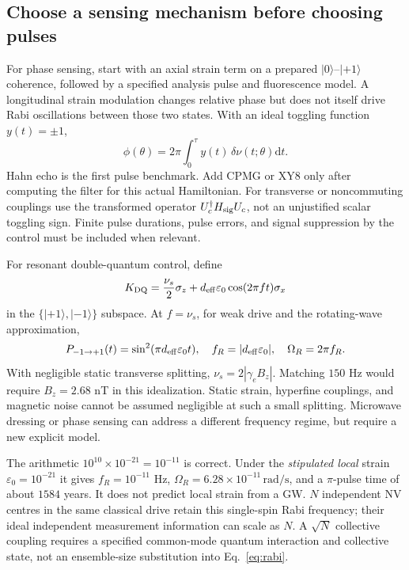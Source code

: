 \documentclass[a4paper,11pt]{article}
\newcommand{\dd}{\mathrm{d}}
\newcommand{\ket}[1]{\lvert #1\rangle}
\newcommand{\eps}{\varepsilon}
\begin{document}
\subsection{Choose a sensing mechanism before choosing pulses}

For phase sensing, start with an axial strain term on a prepared $\ket0$--$\ket{+1}$ coherence, followed by a specified analysis pulse and fluorescence model. A longitudinal strain modulation changes relative phase but does not itself drive Rabi oscillations between those two states. With an ideal toggling function $y(t)=\pm1$,
\begin{equation}
 \phi(\theta)=2\pi\int_0^\tau y(t)\,\delta\nu(t;\theta)\dd t.
 \label{eq:phase}
\end{equation}
Hahn echo is the first pulse benchmark. Add CPMG or XY8 only after computing the filter for this actual Hamiltonian. For transverse or noncommuting couplings use the transformed operator $U_c^\dagger H_{\rm sig}U_c$, not an unjustified scalar toggling sign. Finite pulse durations, pulse errors, and signal suppression by the control must be included when relevant.

For resonant double-quantum control, define
\begin{equation}
 K_{\rm DQ}=\frac{\nu_s}{2}\sigma_z+d_{\rm eff}\eps_0\cos(2\pi f t)\sigma_x
\end{equation}
in the $\{\ket{+1},\ket{-1}\}$ subspace. At $f=\nu_s$, for weak drive and the rotating-wave approximation,
\begin{equation}
 P_{-1\to+1}(t)=\sin^2(\pi d_{\rm eff}\eps_0t),\quad
 f_R=|d_{\rm eff}\eps_0|,\quad \Omega_R=2\pi f_R.
 \label{eq:rabi}
\end{equation}
With negligible static transverse splitting, $\nu_s=2|\gamma_eB_z|$. Matching $150$ Hz would require $B_z=2.68$ nT in this idealization. Static strain, hyperfine couplings, and magnetic noise cannot be assumed negligible at such a small splitting. Microwave dressing or phase sensing can address a different frequency regime, but require a new explicit model.

The arithmetic $10^{10}\times10^{-21}=10^{-11}$ is correct. Under the \emph{stipulated local} strain $\eps_0=10^{-21}$ it gives $f_R=10^{-11}$ Hz, $\Omega_R=6.28\times10^{-11}\,\mathrm{rad/s}$, and a $\pi$-pulse time of about $1584$ years. It does not predict local strain from a GW. $N$ independent NV centres in the same classical drive retain this single-spin Rabi frequency; their ideal independent measurement information can scale as $N$. A $\sqrt N$ collective coupling requires a specified common-mode quantum interaction and collective state, not an ensemble-size substitution into Eq.~\eqref{eq:rabi}.
\end{document}
